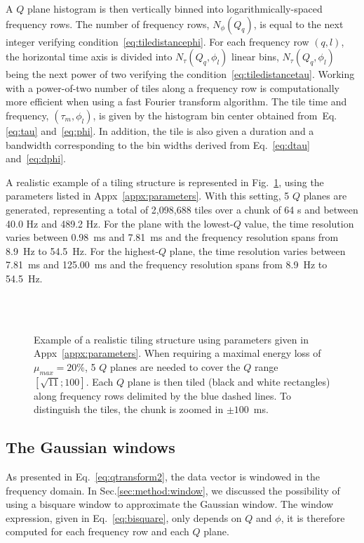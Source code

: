 A $Q$ plane histogram is then vertically binned into logarithmically-spaced frequency rows. The number of frequency rows, $N_\phi(Q_q)$, is equal to the next integer verifying condition~\ref{eq:tiledistancephi}. For each frequency row $(q,l)$, the horizontal time axis is divided into $N_\tau(Q_q,\phi_l)$ linear bins, $N_\tau(Q_q,\phi_l)$ being the next power of two verifying the condition~\ref{eq:tiledistancetau}. Working with a power-of-two number of tiles along a frequency row is computationally more efficient when using a fast Fourier transform algorithm. The tile time and frequency, $(\tau_m, \phi_l)$, is given by the histogram bin center obtained from~Eq.\ref{eq:tau} and~\ref{eq:phi}. In addition, the tile is also given a duration and a bandwidth corresponding to the bin widths derived from Eq.~\ref{eq:dtau} and~\ref{eq:dphi}.


A realistic example of a tiling structure is represented in Fig.~\ref{fig:tiling}, using the parameters listed in Appx~\ref{appx:parameters}. With this setting, 5 $Q$ planes are generated, representing a total of 2,098,688 tiles over a chunk of 64 s and between 40.0 Hz and 489.2 Hz. For the plane with the lowest-$Q$ value, the time resolution varies between 0.98~ms and 7.81~ms and the frequency resolution spans from 8.9~Hz to 54.5~Hz. For the highest-$Q$ plane, the time resolution varies between 7.81~ms and 125.00~ms and the frequency resolution spans from 8.9~Hz to 54.5~Hz.
\begin{figure}
  \center
    \\
    \\
  \caption{Example of a realistic tiling structure using parameters given in Appx~\ref{appx:parameters}. When requiring a maximal energy loss of $\mu_{max}=20\%$, 5 $Q$ planes are needed to cover the $Q$ range $[\sqrt{11}; 100]$. Each $Q$ plane is then tiled (black and white rectangles) along frequency rows delimited by the blue dashed lines. To distinguish the tiles, the chunk is zoomed in $\pm 100$~ms.}
  \label{fig:tiling}
\end{figure}

\subsection{The Gaussian windows} \label{sec:algorithm:window}
As presented in Eq.~\ref{eq:qtransform2}, the data vector is windowed in the frequency domain. In Sec.\ref{sec:method:window}, we discussed the possibility of using a bisquare window to approximate the Gaussian window. The window expression, given in Eq.~\ref{eq:bisquare}, only depends on $Q$ and $\phi$, it is therefore computed for each frequency row and each $Q$ plane.

